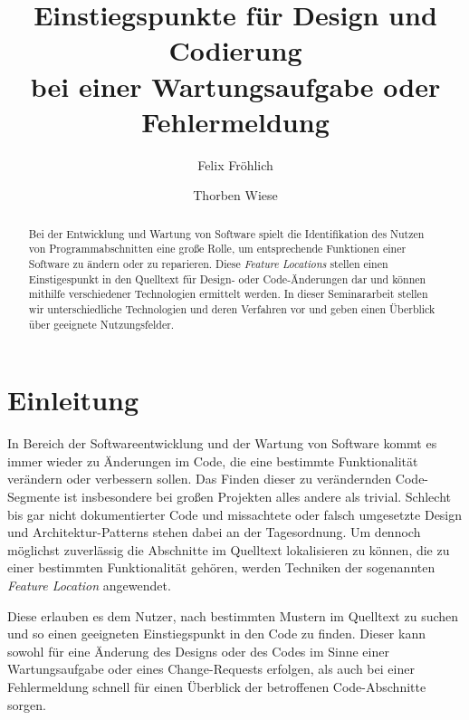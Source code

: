 \documentclass[runningheads,a4paper]{llncs}
\begin{document}
\title{Einstiegspunkte für Design und Codierung \\bei einer Wartungsaufgabe oder Fehlermeldung}


\author{Felix Fröhlich \and Thorben Wiese}



\maketitle

\begin{abstract}
Bei der Entwicklung und Wartung von Software spielt die Identifikation des Nutzen von Programmabschnitten eine große Rolle, um entsprechende Funktionen einer Software zu ändern oder zu reparieren. Diese \textit{Feature Locations} stellen einen Einstigespunkt in den Quelltext für Design- oder Code-Änderungen dar und können mithilfe verschiedener Technologien ermittelt werden. In dieser Seminararbeit stellen wir unterschiedliche Technologien und deren Verfahren vor und geben einen Überblick über geeignete Nutzungsfelder.
\end{abstract}

\section{Einleitung}

In Bereich der Softwareentwicklung und der Wartung von Software kommt es immer wieder zu Änderungen im Code, die eine bestimmte Funktionalität verändern oder verbessern sollen. Das Finden dieser zu verändernden Code-Segmente ist insbesondere bei großen Projekten alles andere als trivial. Schlecht bis gar nicht dokumentierter Code und missachtete oder falsch umgesetzte Design und Architektur-Patterns stehen dabei an der Tagesordnung. Um dennoch möglichst zuverlässig die Abschnitte im Quelltext lokalisieren zu können, die zu einer bestimmten Funktionalität gehören, werden Techniken der sogenannten \textit{Feature Location} angewendet.

Diese erlauben es dem Nutzer, nach bestimmten Mustern im Quelltext zu suchen und so einen geeigneten Einstiegspunkt in den Code zu finden. Dieser kann sowohl für eine Änderung des Designs oder des Codes im Sinne einer Wartungsaufgabe oder eines Change-Requests erfolgen, als auch bei einer Fehlermeldung schnell für einen Überblick der betroffenen Code-Abschnitte sorgen.
\end{document}
